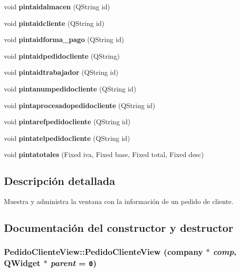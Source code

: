 \begin{CompactItemize}
\item 
void {\bf pintaidalmacen} (QString id)\label{classPedidoClienteView_a10}

\item 
void {\bf pintaidcliente} (QString id)\label{classPedidoClienteView_a11}

\item 
void {\bf pintaidforma\_\-pago} (QString id)\label{classPedidoClienteView_a12}

\item 
void {\bf pintaidpedidocliente} (QString)\label{classPedidoClienteView_a13}

\item 
void {\bf pintaidtrabajador} (QString id)\label{classPedidoClienteView_a14}

\item 
void {\bf pintanumpedidocliente} (QString id)\label{classPedidoClienteView_a15}

\item 
void {\bf pintaprocesadopedidocliente} (QString id)\label{classPedidoClienteView_a16}

\item 
void {\bf pintarefpedidocliente} (QString id)\label{classPedidoClienteView_a17}

\item 
void {\bf pintatelpedidocliente} (QString id)\label{classPedidoClienteView_a18}

\item 
void {\bf pintatotales} (Fixed iva, Fixed base, Fixed total, Fixed desc)\label{classPedidoClienteView_a19}

\end{CompactItemize}


\subsection{Descripci\'{o}n detallada}
Muestra y administra la ventana con la informaci\'{o}n de un pedido de cliente. 



\subsection{Documentaci\'{o}n del constructor y destructor}
\subsubsection{\setlength{\rightskip}{0pt plus 5cm}Pedido\-Cliente\-View::Pedido\-Cliente\-View ({\bf company} $\ast$ {\em comp}, QWidget $\ast$ {\em parent} = {\tt 0})}\label{classPedidoClienteView_a5}


